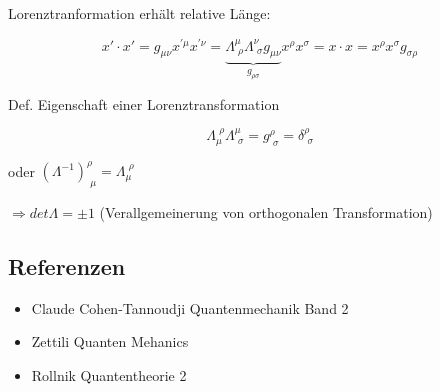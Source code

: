 Lorenztranformation erhält relative Länge:

\[x'\cdot x' = g_{\mu\nu}x^{'\mu}x^{'\nu} = \underbrace{\Lambda^\mu_{\,\, \rho}  \Lambda^\nu_{\,\, \sigma}g_{\mu\nu}}_{g_{\rho\sigma}}x^\rho x^\sigma = x\cdot x = x^\rho x^\sigma g_{\sigma\rho}\]

Def. Eigenschaft einer Lorenztransformation

\[\Lambda_\mu^{\,\, \rho}\Lambda^\mu_{\,\,\sigma} = g^\rho_{\,\,\sigma} = \delta^\rho_{\,\, \sigma}  \]

oder \((\Lambda^{-1})^\rho_{\,\,\mu} = \Lambda_\mu^{\,\,\rho}\)

\(\Rightarrow det\Lambda = \pm 1\) (Verallgemeinerung von orthogonalen Transformation)








\subsection*{Referenzen}
\begin{itemize}
\item Claude Cohen-Tannoudji Quantenmechanik Band 2
\item Zettili Quanten Mehanics
\item Rollnik Quantentheorie 2
\end{itemize}


